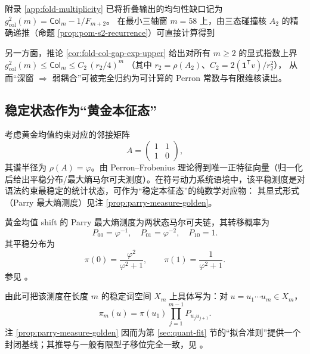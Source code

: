\begin{remark}[三轴最小窗上的折叠碰撞耦合量级]\label{rem:gut-m58-collision-gap-scale}
附录 \ref{app:fold-multiplicity} 已将折叠输出的均匀性缺口记为 \(g_{\mathrm{col}}^2(m)=\mathsf{Col}_m-1/F_{m+2}\)。
在最小三轴窗 \(m=58\) 上，由三态碰撞核 \(A_2\) 的精确递推（命题 \ref{prop:pom-s2-recurrence}）可直接计算得到

\par
另一方面，推论 \ref{cor:fold-col-gap-exp-upper} 给出对所有 \(m\ge 2\) 的显式指数上界
\(
g_{\mathrm{col}}^2(m)\le \mathsf{Col}_m\le C_2\,(r_2/4)^m
\)
（其中 \(r_2=\rho(A_2)\)、\(C_2=2(\mathbf{1}^{\mathsf T}v)/r_2^2\)），
从而“深窗 \(\Rightarrow\) 弱耦合”可被完全归约为可计算的 Perron 常数与有限维核读出。
\end{remark}

\subsection{稳定状态作为“黄金本征态”}

考虑黄金均值约束对应的邻接矩阵
\[
A=\begin{pmatrix}
1 & 1\\
1 & 0
\end{pmatrix},
\]
其谱半径为 $\rho(A)=\varphi$。由 Perron--Frobenius 理论得到唯一正特征向量（归一化后给出平稳分布/最大熵马尔可夫测度）。在符号动力系统语境中，该平稳测度是对语法约束最稳定的统计状态，可作为“稳定本征态”的纯数学对应物：
其显式形式（Parry 最大熵测度）见注 \ref{prop:parry-measure-golden}。

\begin{remark}\label{prop:parry-measure-golden}
黄金均值 shift 的 Parry 最大熵测度为两状态马尔可夫链，其转移概率为
\[
P_{00}=\varphi^{-1},\quad P_{01}=\varphi^{-2},\quad P_{10}=1.
\]
其平稳分布为
\[
\pi(0)=\frac{\varphi^2}{\varphi^2+1},\qquad
\pi(1)=\frac{1}{\varphi^2+1}.
\]
参见 \cite{LindMarcus1995}。
\end{remark}

由此可把该测度在长度 $m$ 的稳定词空间 $X_m$ 上具体写为：对 $u=u_1\cdots u_m\in X_m$，
\[
\pi_m(u)=\pi(u_1)\prod_{j=1}^{m-1} P_{u_j u_{j+1}}.
\]
注 \ref{prop:parry-measure-golden} 因而为第 \ref{sec:quant-fit} 节的“拟合准则”提供一个封闭基线；其推导与一般有限型子移位完全一致，见 \cite{LindMarcus1995}。

